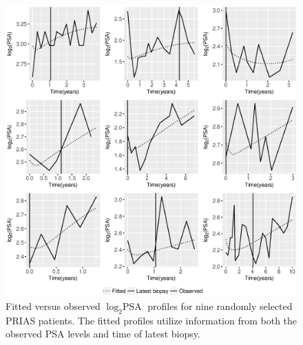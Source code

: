 \begin{figure}[!htb]
	\centerline{\includegraphics[width=\columnwidth]{images/model_fit/subject_fittedVsObserved_psa_t3.eps}}
	\caption{Fitted versus observed $\log_2 \mbox{PSA}$ profiles for nine randomly selected PRIAS patients. The fitted profiles utilize information from both the observed PSA levels and time of latest biopsy.}
	\label{fig : subject_fittedVsObserved_psa_t3}
	\end{figure}

